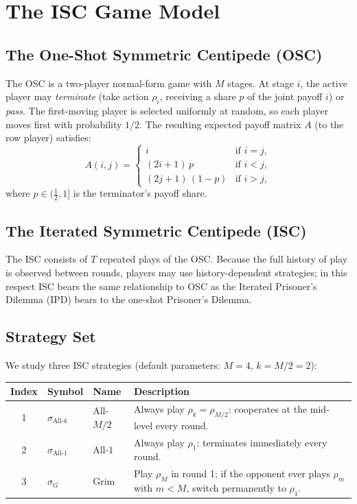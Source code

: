\documentclass[12pt,a4paper]{article}
\begin{document}
\section{The ISC Game Model}
\label{sec:model}

\subsection{The One-Shot Symmetric Centipede (OSC)}

The OSC is a two-player normal-form game with $M$ stages. At stage $i$, the
active player may \emph{terminate} (take action $\rho_i$, receiving a share $p$
of the joint payoff $i$) or \emph{pass}. The first-moving player is selected
uniformly at random, so each player moves first with probability $1/2$. The
resulting expected payoff matrix $A$ (to the row player) satisfies:
\[
  A(i,j) = \begin{cases}
    i                  & \text{if } i = j, \\
    (2i+1)\,p          & \text{if } i < j, \\
    (2j+1)\,(1-p)      & \text{if } i > j,
  \end{cases}
\]
where $p\in(\tfrac{1}{2},1]$ is the terminator's payoff share.

\subsection{The Iterated Symmetric Centipede (ISC)}

The ISC consists of $T$ repeated plays of the OSC. Because the full history of
play is observed between rounds, players may use history-dependent strategies; in
this respect ISC bears the same relationship to OSC as the Iterated Prisoner's
Dilemma (IPD) bears to the one-shot Prisoner's Dilemma.

\subsection{Strategy Set}
\label{sec:strategies}

We study three ISC strategies (default parameters: $M=4$, $k = M/2 = 2$):

\begin{center}
\begin{tabular}{cllp{7.5cm}}
\toprule
Index & Symbol & Name & Description \\
\midrule
1 & $\sigma_{\text{All-}k}$ & All-$M/2$ &
    Always play $\rho_{k}=\rho_{M/2}$: cooperates at the mid-level every round. \\
2 & $\sigma_{\text{All-}1}$   & All-$1$ &
    Always play $\rho_1$: terminates immediately every round. \\
3 & $\sigma_G$                & Grim &
    Play $\rho_M$ in round 1; if the opponent ever plays $\rho_m$ with
    $m < M$, switch permanently to $\rho_1$. \\
\bottomrule
\end{tabular}
\end{center}
\end{document}
